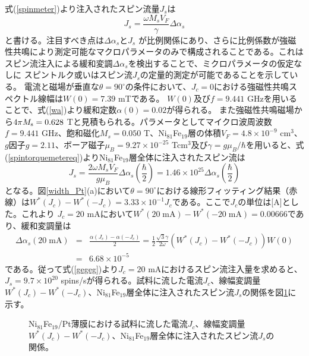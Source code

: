 式(\ref{spinmeter})より注入されたスピン流量$J_s$は
\begin{equation}
J_s=\frac{\omega M_s V_F}{\gamma}\Delta \alpha_s\label{spintorquemetereq}
\end{equation}
と書ける。注目すべき点は$\Delta\alpha_s$と$J_s$
が比例関係にあり、さらに比例係数が強磁性共鳴により測定可能なマクロパラメータのみで構成されることである。これはスピン流注入による緩和変調$\Delta \alpha_s$を検出することで、ミクロパラメータの仮定なしに
スピントルク或いはスピン流$J_s$の定量的測定が可能であることを示している。
電流と磁場が垂直な$\theta=90^\circ$の条件において、$J_c=0$における強磁性共鳴スペクトル線幅は$W(0)=7.39$ mTである。
$W(0)$及び$f=9.441$ GHzを用いることで、式(\ref{wa})より緩和定数$\alpha(0)=0.02$が得られる。
また強磁性共鳴磁場から$4\pi M_{\rm s} = 0.628$ Tと見積もられる。パラメータとしてマイクロ波周波数$f=9.441$ GHz、飽和磁化$M_s=0.050$ T、Ni$_{81}$Fe$_{19}$層の体積$V_F=4.8\times 10^{-9}$ cm$^3$、$g$因子$g=2.11$、ボーア磁子$\mu_B=9.27\times10^{-25}$ Tcm$^3$及び$\gamma=g \mu_B/\hbar$を用いると、式(\ref{spintorquemetereq})よりNi$_{81}$Fe$_{19}$層全体に注入されたスピン流は
\begin{equation}
J_s=\frac{2\omega M_s V_F }{g \mu_B}\Delta \alpha_s\left(\frac{\hbar}{2}\right)=1.46\times10^{25}\Delta \alpha_s\left(\frac{\hbar}{2}\right)\label{gegeg}
\end{equation}
となる。図\ref{width_Pt}(a)において$\theta=90^\circ$における線形フィッティング結果（赤線）は$W^*(J_c)-W^*(-J_c)=3.33\times 10^{-1} J_c $である。ここで$J_c$の単位は[A]とした。これより
$J_c=20$ mAにおいて$W^*(20 \;\text{mA})-W^*(-20\; \text{mA})=0.00666$であり、緩和変調量は
\begin{eqnarray}
\Delta \alpha_s(20 \;\text{mA})&=&\frac{\alpha(J_c)-\alpha(-J_c)}{2}= \frac{1}{2}\frac{\sqrt{3}\gamma}{2\omega}\left(W^*(J_c)-W^*(-J_c)\right)
W(0)\nonumber\\
&=&6.68\times 10^{-5}
\end{eqnarray}
である。従って式(\ref{gegeg})より$J_c=20$ mAにおけるスピン流注入量を求めると、$J_s=9.7\times10^{20}$ spins/sが得られる。試料に流した電流$J_c$、線幅変調量$W^*(J_c)-W^*(-J_c)$、Ni$_{81}$Fe$_{19}$層全体に注入されたスピン流$J_s$の関係を図\ref{spinmeterA}に示す。

\begin{figure}[tbp]
 \begin{center}
 \caption{Ni$_{81}$Fe$_{19}$/Pt薄膜における試料に流した電流$J_c$、線幅変調量$W^*(J_c)-W^*(-J_c)$、Ni$_{81}$Fe$_{19}$層全体に注入されたスピン流$J_s$の関係。
}
 \label{spinmeterA}
 \end{center}
\end{figure}


